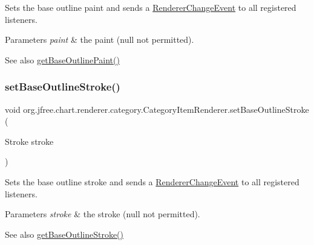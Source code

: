 Sets the base outline paint and sends a \mbox{\hyperlink{}{Renderer\+Change\+Event}} to all registered listeners.


\begin{DoxyParams}{Parameters}
{\em paint} & the paint ({\ttfamily null} not permitted).\\
\hline
\end{DoxyParams}
\begin{DoxySeeAlso}{See also}
\mbox{\hyperlink{interfaceorg_1_1jfree_1_1chart_1_1renderer_1_1category_1_1_category_item_renderer_ac377433615b656ed7e80983b9ce9723f}{get\+Base\+Outline\+Paint()}} 
\end{DoxySeeAlso}
\mbox{\label{interfaceorg_1_1jfree_1_1chart_1_1renderer_1_1category_1_1_category_item_renderer_a3440b96cffb9e0312622dc733fb18f73}} 
\subsubsection{\texorpdfstring{set\+Base\+Outline\+Stroke()}{setBaseOutlineStroke()}}
{\footnotesize\ttfamily void org.\+jfree.\+chart.\+renderer.\+category.\+Category\+Item\+Renderer.\+set\+Base\+Outline\+Stroke (\begin{DoxyParamCaption}\item[{Stroke}]{stroke }\end{DoxyParamCaption})}

Sets the base outline stroke and sends a \mbox{\hyperlink{}{Renderer\+Change\+Event}} to all registered listeners.


\begin{DoxyParams}{Parameters}
{\em stroke} & the stroke ({\ttfamily null} not permitted).\\
\hline
\end{DoxyParams}
\begin{DoxySeeAlso}{See also}
\mbox{\hyperlink{interfaceorg_1_1jfree_1_1chart_1_1renderer_1_1category_1_1_category_item_renderer_aa4e62e03eb5014805e4130ac51b5be78}{get\+Base\+Outline\+Stroke()}} 
\end{DoxySeeAlso}
\mbox{\label{interfaceorg_1_1jfree_1_1chart_1_1renderer_1_1category_1_1_category_item_renderer_a077f331549f2d9a83380ad763d03f3a6}} 
